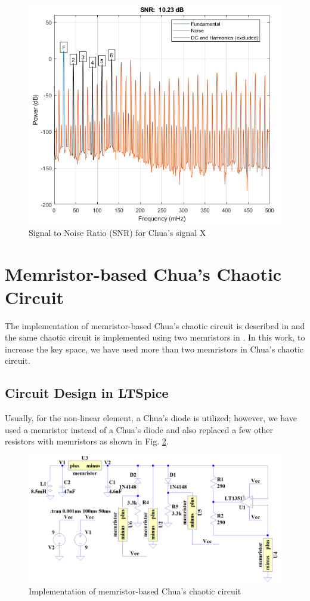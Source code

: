 \begin{figure}[!t]
    \centering
    \includegraphics[width = 0.6\linewidth]{figs/Fig5SNR_chuaX.PNG}
    \caption{Signal to Noise Ratio (SNR) for Chua’s signal X}
    \label{fig:SNR}
\end{figure}


\section*{Memristor-based Chua's Chaotic Circuit}

The implementation of memristor-based Chua's chaotic circuit is described in \cite{muthuswamy2010implementing} and the same chaotic circuit is implemented using two memristors in \cite{bao2017two}. In this work, to increase the key space, we have used more than two memristors in Chua's chaotic circuit. 

\subsection*{Circuit Design in LTSpice}
Usually, for the non-linear element, a Chua's diode is utilized; however, we have used a memristor instead of a Chua's diode and also replaced a few other resistors with memristors as shown in Fig. \ref{fig:3}.

\begin{figure}[!t]
    \centering
    \includegraphics[width = 0.9\linewidth]{figs/Fig6chua_memristor_LTSpice.PNG}
    \caption{Implementation of memristor-based Chua's chaotic circuit}
    \label{fig:3}
\end{figure}


